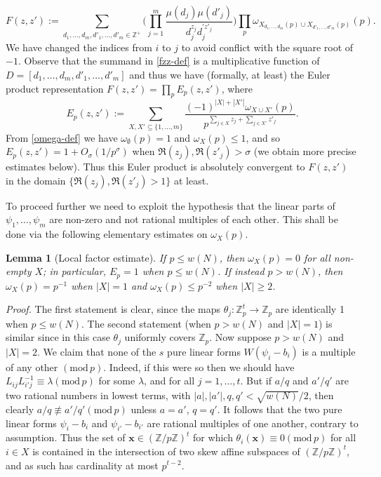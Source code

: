 \documentclass[12pt,a4paper,reqno]{amsart}
\numberwithin{equation}{section}
\theoremstyle{plain}
\newtheorem{lemma}[subsection]{Lemma}
\theoremstyle{definition}
\renewcommand{\leq}{\leqslant}
\renewcommand{\geq}{\geqslant}
\newcommand{\md}[1]{\ensuremath{(\mbox{mod}\, #1)}}
\def\Z{{\mathbb Z}}
\def\w{w}
\def\vs{\vspace{11pt}}
\def\ni{\noindent}
\def\proof{\noindent\textit{Proof. }}
\def\endproof{\hfill{\usebox{\proofbox}}}
\begin{document}
\begin{equation}\label{fzz-def}
 F(z,z') :=
  \sum_{d_1,\ldots,d_m,d'_1,\ldots,d'_m \in \Z^+}
\bigg(\prod_{j=1}^m \frac{\mu(d_j) \mu(d'_j)}{d_j^{z_j} d_j^{\prime z'_j}}\bigg)
\prod_p \omega_{X_{d_1,\ldots,d_m}(p) \cup X_{d'_1,\ldots,d'_m}(p)}(p).
\end{equation}
We have changed the indices from $i$ to $j$ to avoid conflict with the square
root of $-1$.
Observe that the summand in \eqref{fzz-def} is a multiplicative function of $D = [d_1,\dots,d_m,d'_1,\dots,d'_m]$ and thus we have  (formally,
at least) the Euler product representation $F(z,z') = \prod_p E_p(z,z')$, where
\begin{equation}\label{ep-def}
 E_p(z,z') := \sum_{X,X' \subseteq\{1,\ldots,m\}} \frac{(-1)^{|X|+|X'|} \omega_{X \cup X'}(p)}{p^{\sum_{j \in X} z_j +
\sum_{j \in X'} z'_j}}.
\end{equation}
From \eqref{omega-def} we have $\omega_\emptyset(p) = 1$ and $\omega_X(p) \leq 1$, and so $E_p(z,z') = 1 + O_\sigma(1/p^\sigma)$
when $\Re(z_j), \Re(z'_j) > \sigma$ (we obtain more precise estimates below).  
Thus this Euler product is absolutely convergent to $F(z,z')$ in the domain $\{ \Re(z_j), \Re(z'_j) > 1\}$ at least.\vs

\ni To proceed further we need to exploit the hypothesis that the linear parts
of $\psi_1, \ldots, \psi_m$ are non-zero and not rational multiples of each other.
This shall be done via the following elementary estimates on $\omega_X(p)$.

\begin{lemma}[Local factor estimate]\label{lem9.2}  If $p \leq \w(N)$, then $\omega_X(p) = 0$ for all non-empty $X$; in particular, $E_p = 1$ when
$p \leq \w(N)$.  If instead $p > \w(N)$, then $\omega_X(p) = p^{-1}$ when $|X|=1$ and $\omega_X(p) \leq p^{-2}$
when $|X| \geq 2$.
\end{lemma}

\proof The first statement is clear, since the maps $\theta_j: \Z_p^t \to \Z_p$ are identically 1 when $p \leq \w(N)$.  The second
statement (when $p > \w(N)$ and $|X|=1$) is similar since in this case $\theta_j$ uniformly covers $\Z_p$.  Now
suppose $p >\w(N)$ and $|X|=2$.  We claim that none of the $s$ pure linear forms $W(\psi_i - b_i)$ is a multiple of any other $\md{p}$. Indeed, if this were so then we should have $L_{ij}L^{-1}_{i'j} \equiv \lambda \md{p}$ for some $\lambda$, and for all $j = 1,\dots,t$. But if $a/q$ and $a'/q'$ are two rational numbers in lowest terms, with $|a|, |a'|, q,q' < \sqrt{\w(N)}/2$, then clearly $a/q \not\equiv a'/q' \md{p}$ unless $a = a'$, $q = q'$. It follows that the two pure linear forms $\psi_i - b_i$ and $\psi_{i'} - b_{i'}$ are rational multiples of one another, contrary to assumption. Thus the set of $\mathbf{x} \in (\mathbb{Z}/p\mathbb{Z})^t$ for which $\theta_i(\mathbf{x}) \equiv 0 \md{p}$ for all $i \in X$ is contained in the intersection of two skew affine subspaces of $(\mathbb{Z}/p\mathbb{Z})^t$, and as such has cardinality at most $p^{t - 2}$.\endproof\vspace{11pt}
\end{document}
